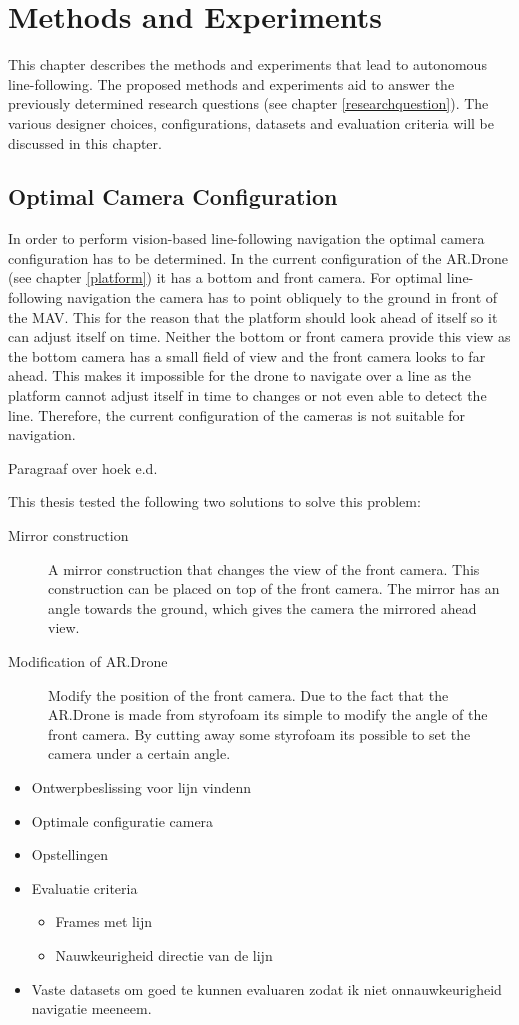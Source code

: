 \documentclass[a4paper]{article}
\begin{document}
\section{Methods and Experiments}
This chapter describes the methods and experiments that lead to autonomous line-following. The proposed methods and experiments aid to answer the previously determined research questions (see chapter \ref{researchquestion}). The various designer choices, configurations, datasets and evaluation criteria will be discussed in this chapter.

\subsection{Optimal Camera Configuration}
In order to perform vision-based line-following navigation the optimal camera configuration has to be determined. In the current configuration of the AR.Drone (see chapter \ref{platform}) it has a bottom and front camera. For optimal line-following navigation the camera has to point obliquely to the ground in front of the MAV. This for the reason that the platform should look ahead of itself so it can adjust itself on time. Neither the bottom or front camera provide this view as the bottom camera has a small field of view and the front camera looks to far ahead. This makes it impossible for the drone to navigate over a line as the platform cannot adjust itself in time to changes or not even able to detect the line. Therefore, the current configuration of the cameras is not suitable for navigation.

Paragraaf over hoek e.d.

This thesis tested the following two solutions to solve this problem:
\begin{description}
\item[Mirror construction] A mirror construction that changes the view of the front camera. This construction can be placed on top of the front camera. The mirror has an angle towards the ground, which gives the camera the mirrored ahead view.
\item[Modification of AR.Drone] Modify the position of the front camera. Due to the fact that the AR.Drone is made from styrofoam its simple to modify the angle of the front camera. By cutting away some styrofoam its possible to set the camera under a certain angle.
\end{description}
\begin{itemize}
\item Ontwerpbeslissing voor lijn vindenn
\item Optimale configuratie camera
\item Opstellingen
\item Evaluatie criteria
\begin{itemize}
\item Frames met lijn
\item Nauwkeurigheid directie van de lijn
\end{itemize}
\item Vaste datasets om goed te kunnen evaluaren zodat ik niet onnauwkeurigheid navigatie meeneem.
\end{itemize}
\end{document}
